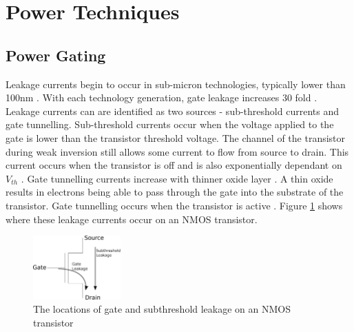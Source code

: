 
\section{Power Techniques}
\subsection{Power Gating}



Leakage currents begin to occur in sub-micron technologies, typically lower than 100nm \cite{bsoul2010fpga, nair2009comparative}.
With each technology generation, gate leakage increases 30 fold \cite{bernstein2003design}.
Leakage currents can are identified as two sources - sub-threshold currents and gate tunnelling. 
Sub-threshold currents occur when the voltage applied to the gate is lower than the transistor threshold voltage. 
The channel of the transistor during weak inversion still allows some current to flow from source to drain.
This current occurs when the transistor is off and is also exponentially dependant on $V_{th}$ \cite{borkar1999design}.
Gate tunnelling currents increase with thinner oxide layer \cite{m2002international}. 
A thin oxide results in electrons being able to pass through the gate into the substrate of the transistor. 
Gate tunnelling occurs when the transistor is active \cite{nair2009comparative}.
Figure \ref{fig:leakage} shows where these leakage currents occur on an NMOS transistor.

\begin{figure}
\centering
\includegraphics[width=0.3\textwidth]{Figures/leakage.eps}
\caption{The locations of gate and subthreshold leakage on an NMOS transistor}
\label{fig:leakage}
\end{figure}



